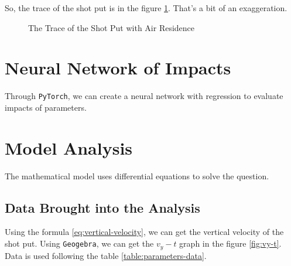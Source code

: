 \documentclass{article}
\begin{document}
So, the trace of the shot put is in the figure \ref{fig:trace-with-residence}. That's a bit of an exaggeration.

\begin{figure}[H]
    \centering
    \caption{The Trace of the Shot Put with Air Residence}
    \label{fig:trace-with-residence}
\end{figure}

\section{Neural Network of Impacts}

Through \texttt{PyTorch}, we can create a neural network with regression to evaluate impacts of parameters.

\section{Model Analysis}

The mathematical model uses differential equations to solve the question.

\subsection{Data Brought into the Analysis}

Using the formula \ref{eq:vertical-velocity}, we can get the vertical velocity of the shot put. Using \texttt{Geogebra}, we can get the $v_y-t$ graph in the figure \ref{fig:vy-t}. Data is used following the table \ref{table:parameters-data}.
\end{document}
